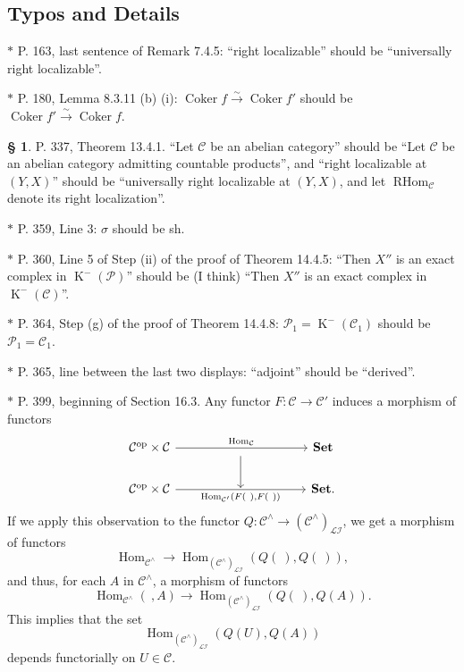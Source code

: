 \documentclass[12pt]{article}
\theoremstyle{remark}
\theoremstyle{definition}
\newtheorem{s}[thm]{\S}
\newcommand{\cc}{\mathcal}
\newcommand{\C}{\mathcal C}
\newcommand{\mc}{\mathcal}
\newcommand{\oo}{\operatorname}
\newcommand{\Set}{\mathbf{Set}}
\newcommand{\xr}{\xrightarrow}
\DeclareMathOperator{\Coker}{Coker}
\DeclareMathOperator{\Hom}{Hom}%
\DeclareMathOperator{\op}{op}
\begin{document}
\subsection{Typos and Details}
%
$*$ P. 163, last sentence of Remark 7.4.5: ``right localizable'' should be ``universally right localizable''.

\noindent $*$ P. 180, Lemma 8.3.11 (b) (i): $\Coker f\xr\sim\Coker f'$ should be $\Coker f'\xr\sim\Coker f$.

\begin{s}\label{1341}
P. 337, Theorem 13.4.1. ``Let $\C$ be an abelian category'' should be ``Let $\C$ be an abelian category admitting countable products'', and ``right localizable at $(Y,X)$'' should be ``universally right localizable at $(Y,X)$, and let $\oo{RHom}_\C$ denote its right localization''.
\end{s}

\noindent $*$ P. 359, Line 3: $\sigma$ should be sh.


\noindent $*$ P. 360, Line 5 of Step (ii) of the proof of Theorem 14.4.5: ``Then $X''$ is an exact complex in $\oo K^-(\cc P)$'' should be (I think) ``Then $X''$ is an exact complex in $\oo K^-(\cc C)$''.


\noindent $*$ P. 364, Step (g) of the proof of Theorem 14.4.8: $\mc P_1=\oo K^-(\C_1)$ should be $\mc P_1=\C_1$.

\noindent $*$ P. 365, line between the last two displays: ``adjoint'' should be ``derived''.


\noindent $*$ P. 399, beginning of Section 16.3. Any functor $F:\C\to\C'$ induces a morphism of functors 
$$
\begin{tikzcd}
%
\C^{\op}\times\C\ar{rrrr}{\Hom_\C}&&\ar{d}&&\Set\\ 
\C^{\op}\times\C\ar{rrrr}[swap]{\Hom_{\C'}(F(\ ),F(\ ))}&&{}&&\Set.
%
\end{tikzcd}
$$
If we apply this observation to the functor $Q:\C^\wedge\to(\C^\wedge)_{\cc{LI}}$, we get a morphism of functors 
$$
\Hom_{\C^\wedge}\to\Hom_{(\C^\wedge)_{\cc{LI}}}(Q(\ ),Q(\ )),
$$ 
and thus, for each $A$ in $\C^\wedge$, a morphism of functors 
$$
\Hom_{\C^\wedge}(\ ,A)\to\Hom_{(\C^\wedge)_{\cc{LI}}}(Q(\ ),Q(A)).
$$ 
This implies that the set 
$$
\Hom_{(\C^\wedge)_{\cc{LI}}}(Q(U),Q(A))
$$ 
depends functorially on $U\in\C$.
\end{document}
